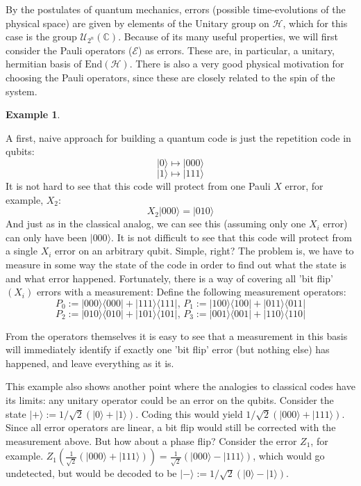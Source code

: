 \documentclass{article}
\def\E{\mathcal{E}}
\def\C{\mathbb{C}}
\def\End{\text{End}}
\def\H{\mathcal{H}}
\theoremstyle{definition}
\newtheorem{ex}[Satz]{Example}
\begin{document}
By the postulates of quantum mechanics, errors (possible time-evolutions of the physical space) are given by elements of the Unitary group on $\mathcal{H}$, which for this case is the group $\mathcal{U}_{2^n}(\C)$.
Because of its many useful properties, we will first consider the Pauli operators ($\E$) as errors. These are, in particular, a unitary, hermitian basis of $\End(\H)$. There is also a very good physical motivation for choosing the Pauli operators, since these are closely related to the spin of the system.

\begin{ex} \label{repetitionqubits}

  A first, naive approach for building a quantum code is just the repetition code in qubits: 
  \[ |0\rangle \mapsto |000\rangle \]
  \[ |1\rangle \mapsto |111\rangle \]
  It is not hard to see that this code will protect from one Pauli $X$ error, for example, $X_2$:
  \[ X_2 |000 \rangle = |010 \rangle \]
  And just as in the classical analog, we can see this (assuming only one $X_i$ error) can only have been $|000 \rangle$. It is not difficult to see that this code will protect from a single $X_i$ error on an arbitrary qubit.
  Simple, right? The problem is, we have to measure in some way the state of the code in order to find out what the state is and what error happened. Fortunately, there is a way of covering all 'bit flip' $(X_i)$ errors with a measurement:
  Define the following measurement operators: 
  \[ P_0 := |000\rangle \langle 000 | + |111\rangle \langle 111 | \text{,    } P_1 := |100\rangle \langle 100 | + |011\rangle \langle 011 | \]
  \[ P_2 := |010\rangle \langle 010 | + |101\rangle \langle 101 | \text{,    } P_3 := |001\rangle \langle 001 | + |110\rangle \langle 110 | \]

  From the operators themselves it is easy to see that a measurement in this basis will immediately identify if exactly one 'bit flip' error (but nothing else) has happened, and leave everything as it is.
\end{ex}

  This example also shows another point where the analogies to classical codes have its limits: any unitary operator could be an error on the qubits.
  Consider the state $| + \rangle := 1/\sqrt{2}(|0\rangle + |1\rangle)$. Coding this would yield $1/\sqrt{2}(|000\rangle + |111\rangle)$. Since all error operators are linear, a bit flip would still be corrected with the measurement above. But how about a phase flip?
  Consider the error $Z_1$, for example. $Z_1 (\frac{1}{ \sqrt{2}} (|000\rangle + |111\rangle)) = \frac{1}{ \sqrt{2} }(|000\rangle - |111\rangle)$, which would go undetected, but would be decoded to be $|- \rangle := 1/\sqrt{2}(|0\rangle - |1\rangle)$.
  
\end{document}
